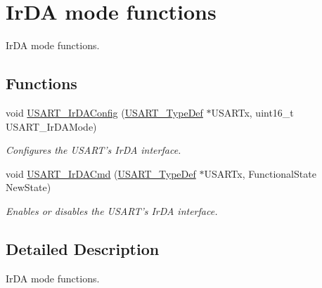 \hypertarget{group___u_s_a_r_t___group7}{}\section{Ir\+D\+A mode functions}
\label{group___u_s_a_r_t___group7}


Ir\+D\+A mode functions.  


\subsection*{Functions}
\begin{DoxyCompactItemize}
\item 
void \hyperlink{group___u_s_a_r_t___group7_ga81a0cd36199040bf6d266b57babd678e}{U\+S\+A\+R\+T\+\_\+\+Ir\+D\+A\+Config} (\hyperlink{struct_u_s_a_r_t___type_def}{U\+S\+A\+R\+T\+\_\+\+Type\+Def} $\ast$U\+S\+A\+R\+Tx, uint16\+\_\+t U\+S\+A\+R\+T\+\_\+\+Ir\+D\+A\+Mode)
\begin{DoxyCompactList}\small\item\em Configures the U\+S\+A\+R\+T's Ir\+D\+A interface. \end{DoxyCompactList}\item 
void \hyperlink{group___u_s_a_r_t___group7_gabff56ebb494fdfadcc6ef4fe9ac8dd24}{U\+S\+A\+R\+T\+\_\+\+Ir\+D\+A\+Cmd} (\hyperlink{struct_u_s_a_r_t___type_def}{U\+S\+A\+R\+T\+\_\+\+Type\+Def} $\ast$U\+S\+A\+R\+Tx, Functional\+State New\+State)
\begin{DoxyCompactList}\small\item\em Enables or disables the U\+S\+A\+R\+T's Ir\+D\+A interface. \end{DoxyCompactList}\end{DoxyCompactItemize}


\subsection{Detailed Description}
Ir\+D\+A mode functions. 


